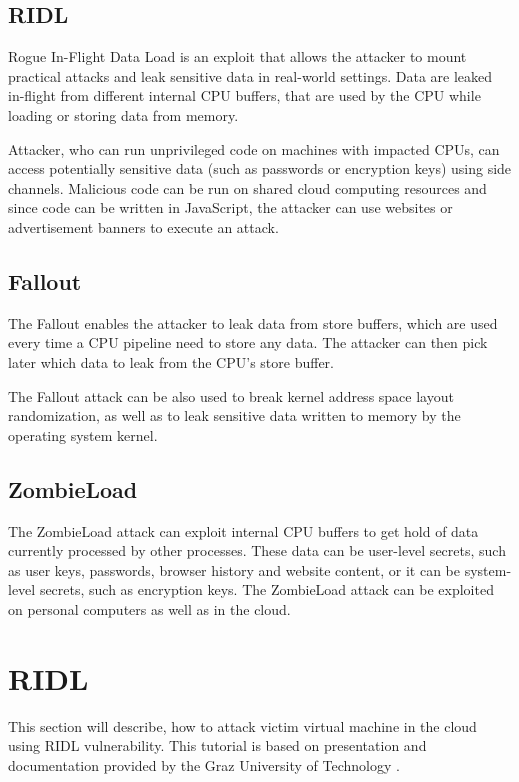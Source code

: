 \documentclass[11pt,a4paper,titlepage]{article}
\begin{document}
        \subsection{RIDL} \label{introduction:ridl}
            Rogue In-Flight Data Load is an exploit that allows the attacker to mount practical attacks and leak sensitive data in real-world settings. Data are leaked in-flight from different internal CPU buffers, that are used by the CPU while loading or storing data from memory.
            
            Attacker, who can run unprivileged code on machines with impacted CPUs, can access potentially sensitive data (such as passwords or encryption keys) using side channels. Malicious code can be run on shared cloud computing resources and since code can be written in JavaScript, the attacker can use websites or advertisement banners to execute an attack.
        
        \subsection{Fallout} \label{introduction:fallout}
            The Fallout enables the attacker to leak data from store buffers, which are used every time a CPU pipeline need to store any data. The attacker can then pick later which data to leak from the CPU's store buffer.
            
            The Fallout attack can be also used to break kernel address space layout randomization, as well as to leak sensitive data written to memory by the operating system kernel.
        
        \subsection{ZombieLoad} \label{introduction:zombieload}
            The ZombieLoad attack can exploit internal CPU buffers to get hold of data currently processed by other processes. These data can be user-level secrets, such as user keys, passwords, browser history and website content, or it can be system-level secrets, such as encryption keys. The ZombieLoad attack can be exploited on personal computers as well as in the cloud.
    
    \section{RIDL} \label{ridl}
        This section will describe, how to attack victim virtual machine in the cloud using RIDL vulnerability. This tutorial is based on presentation and documentation provided by the Graz University of Technology \cite{web:ridlpresentation, web:ridldocumentation}.
        
\end{document}
